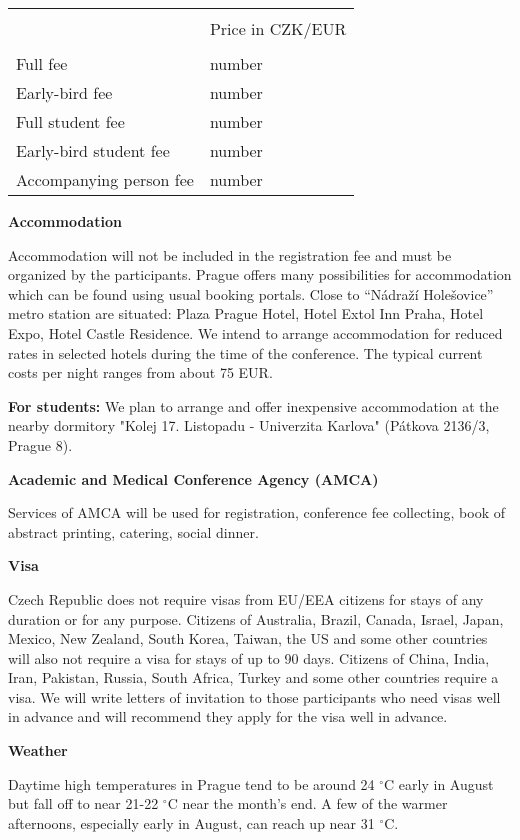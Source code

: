 \documentclass{article}[14pt]
\begin{document}
\begin{table}[h]
\centering
\begin{tabular}{ll}
\hline \\[-1mm]
 &   Price in CZK/EUR  \\[1mm]
\hline \\[-1mm]
 Full fee &  number \\[1mm]
 Early-bird fee & number  \\[1mm]
 Full student fee &  number \\[1mm]
 Early-bird student fee & number  \\[1mm]
 Accompanying person fee & number  \\[1mm]
\hline
\end{tabular}
\end{table}

\begin{center}
{\bf \large Accommodation}
\end{center}

Accommodation will not be included in the registration fee and must be organized by the participants.
Prague offers many possibilities for accommodation which can be found using usual booking portals. Close
to “Nádraží Holešovice” metro station are situated: Plaza Prague Hotel, Hotel Extol Inn Praha, Hotel Expo, Hotel
Castle Residence. We intend to arrange accommodation for reduced rates in selected hotels during the time of
the conference. The typical current costs per night ranges from about 75 EUR.

{\bf For students:} We plan to arrange and offer inexpensive accommodation at the nearby dormitory "Kolej 17.
Listopadu - Univerzita Karlova" (Pátkova 2136/3, Prague 8).

\begin{center}
{\bf \large Academic and Medical Conference Agency (AMCA)}
\end{center}
Services of AMCA will be used for registration, conference fee collecting, book of abstract printing, catering, social dinner.

\begin{center}
{\bf \large Visa}
\end{center}

Czech Republic does not require visas from EU/EEA citizens for stays of any duration or for any purpose.
Citizens of Australia, Brazil, Canada, Israel, Japan, Mexico, New Zealand, South Korea, Taiwan, the US and
some other countries will also not require a visa for stays of up to 90 days. Citizens of China, India, Iran,
Pakistan, Russia, South Africa, Turkey and some other countries require a visa. We will write letters of invitation
to those participants who need visas well in advance and will recommend they apply for the visa well in advance.

\begin{center}
{\bf \large Weather}
\end{center}

Daytime high temperatures in Prague tend to be around 24 ${}^\circ$C early in August but fall off to near
21-22 ${}^\circ$C near the month's end. A few of the warmer afternoons, especially early in August, can reach
up near 31 ${}^\circ$C.
\end{document}
